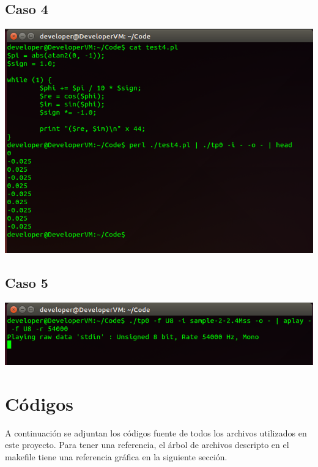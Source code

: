 \documentclass[10pt,a4paper]{article}
\begin{document}
\subsection{Caso 4}
\begin{center}
\includegraphics[scale=0.4]{Imagenes/Caso4.png} 
\end{center}
\subsection{Caso 5}
\begin{center}
\includegraphics[scale=0.4]{Imagenes/Caso5.png} 
\end{center}
\section{Códigos}
A continuación se adjuntan los códigos fuente de todos los archivos utilizados en este proyecto. Para tener una referencia, el árbol de archivos descripto en el makefile tiene una referencia gráfica en la siguiente sección.\\
\end{document}
